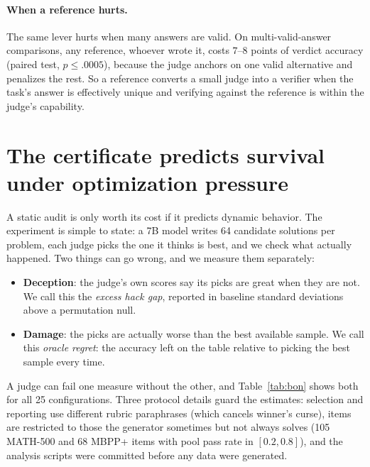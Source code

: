 \documentclass[11pt]{article}
\begin{document}
\paragraph{When a reference hurts.}
The same lever hurts when many answers are valid.
On multi-valid-answer comparisons, any reference, whoever wrote it, costs $7$--$8$ points of verdict accuracy (paired test, $p \le .0005$), because the judge anchors on one valid alternative and penalizes the rest.
So a reference converts a small judge into a verifier when the task's answer is effectively unique and verifying against the reference is within the judge's capability.

\section{The certificate predicts survival under optimization pressure}
\label{sec:pressure}

A static audit is only worth its cost if it predicts dynamic behavior.
The experiment is simple to state: a 7B model writes 64 candidate solutions per problem, each judge picks the one it thinks is best, and we check what actually happened.
Two things can go wrong, and we measure them separately:
\begin{itemize}
\item \textbf{Deception}: the judge's own scores say its picks are great when they are not.
We call this the \emph{excess hack gap}, reported in baseline standard deviations above a permutation null.
\item \textbf{Damage}: the picks are actually worse than the best available sample.
We call this \emph{oracle regret}: the accuracy left on the table relative to picking the best sample every time.
\end{itemize}
A judge can fail one measure without the other, and Table~\ref{tab:bon} shows both for all 25 configurations.
Three protocol details guard the estimates: selection and reporting use different rubric paraphrases (which cancels winner's curse), items are restricted to those the generator sometimes but not always solves (105 \textsc{MATH-500} and 68 \textsc{MBPP+} items with pool pass rate in $[0.2, 0.8]$), and the analysis scripts were committed before any data were generated.
\end{document}
